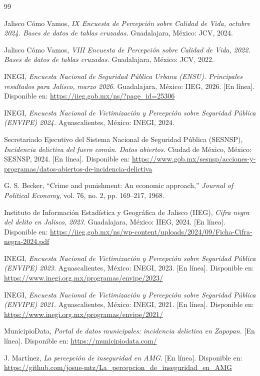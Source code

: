 \documentclass[10pt,twocolumn,letterpaper]{article}
\begin{document}
\begingroup
\small
\renewcommand{\section}[2]{}
\begin{thebibliography}{99}

Jalisco Cómo Vamos, \textit{IX Encuesta de Percepción sobre Calidad de
Vida, octubre 2024. Bases de datos de tablas cruzadas.} Guadalajara,
México: JCV, 2024.

Jalisco Cómo Vamos, \textit{VIII Encuesta de Percepción sobre Calidad de
Vida, 2022. Bases de datos de tablas cruzadas.} Guadalajara, México:
JCV, 2022.

INEGI, \textit{Encuesta Nacional de Seguridad Pública Urbana (ENSU).
Principales resultados para Jalisco, marzo 2026.} Guadalajara, México:
IIEG, 2026. [En línea]. Disponible en:
\url{https://iieg.gob.mx/ns/?page_id=25306}

INEGI, \textit{Encuesta Nacional de Victimización y Percepción sobre
Seguridad Pública (ENVIPE) 2024.} Aguascalientes, México: INEGI, 2024.

Secretariado Ejecutivo del Sistema Nacional de Seguridad Pública
(SESNSP), \textit{Incidencia delictiva del fuero común. Datos abiertos.}
Ciudad de México, México: SESNSP, 2024. [En línea]. Disponible en:
\url{https://www.gob.mx/sesnsp/acciones-y-programas/datos-abiertos-de-incidencia-delictiva}

G. S. Becker, ``Crime and punishment: An economic approach,''
\textit{Journal of Political Economy}, vol. 76, no. 2, pp. 169--217,
1968.

Instituto de Información Estadística y Geográfica de Jalisco (IIEG),
\textit{Cifra negra del delito en Jalisco, 2023.} Guadalajara, México:
IIEG, 2024. [En línea]. Disponible en:
\url{https://iieg.gob.mx/ns/wp-content/uploads/2024/09/Ficha-Cifra-negra-2024.pdf}

INEGI, \textit{Encuesta Nacional de Victimización y Percepción sobre
Seguridad Pública (ENVIPE) 2023.} Aguascalientes, México: INEGI, 2023.
[En línea]. Disponible en:
\url{https://www.inegi.org.mx/programas/envipe/2023/}

INEGI, \textit{Encuesta Nacional de Victimización y Percepción sobre
Seguridad Pública (ENVIPE) 2021.} Aguascalientes, México: INEGI, 2021.
[En línea]. Disponible en:
\url{https://www.inegi.org.mx/programas/envipe/2021/}

MunicipioData, \textit{Portal de datos municipales: incidencia delictiva
en Zapopan.} [En línea]. Disponible en:
\url{https://municipiodata.com/}

 J. Martínez, \textit{La percepción de inseguridad en AMG.} 
[En línea]. Disponible en: 
\url{https://github.com/josue-mtz/La_percepcion_de_inseguridad_en_AMG}


\end{thebibliography}
\endgroup
\end{document}
